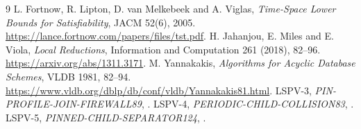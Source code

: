 \documentclass[11pt]{article}
\begin{document}
\begin{thebibliography}{9}
 L. Fortnow, R. Lipton, D. van Melkebeek and A. Viglas,
\emph{Time-Space Lower Bounds for Satisfiability}, JACM 52(6), 2005.
\url{https://lance.fortnow.com/papers/files/tst.pdf}.
 H. Jahanjou, E. Miles and E. Viola,
\emph{Local Reductions}, Information and Computation 261 (2018), 82--96.
\url{https://arxiv.org/abs/1311.3171}.
 M. Yannakakis, \emph{Algorithms for Acyclic Database
Schemes}, VLDB 1981, 82--94.
\url{https://www.vldb.org/dblp/db/conf/vldb/Yannakakis81.html}.
 LSPV-3, \emph{PIN-PROFILE-JOIN-FIREWALL89},
.
 LSPV-4, \emph{PERIODIC-CHILD-COLLISION83},
.
 LSPV-5, \emph{PINNED-CHILD-SEPARATOR124},
.
\end{thebibliography}
\end{document}
